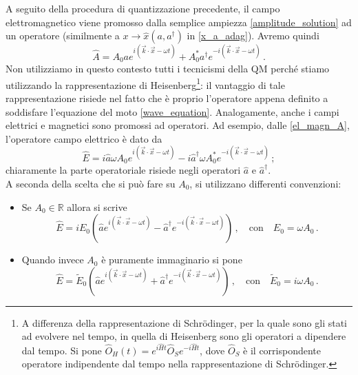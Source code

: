 \noindent A seguito della procedura di quantizzazione precedente, il campo elettromagnetico viene promosso dalla semplice ampiezza \eqref{amplitude_solution} ad un operatore (similmente a $x \to \hat{x}(a,a^\dag)$ in \eqref{x_a_adag}). Avremo quindi
\begin{equation*}
    \hat{A} = A_0 a e^{i \left( \vec{k} \cdot \vec{x} - \omega t \right)} + A_0^\ast a^\dag e^{-i \left( \vec{k} \cdot \vec{x} - \omega t \right)} \, .
\end{equation*}
Non utilizziamo in questo contesto tutti i tecnicismi della QM perché stiamo utilizzando la rappresentazione di Heisenberg\footnote{A differenza della rappresentazione di Schr\"odinger, per la quale sono gli stati ad evolvere nel tempo, in quella di Heisenberg sono gli operatori a dipendere dal tempo. Si pone $\hat{O}_H(t) = e^{i \hat{H} t} \hat{O}_S e^{-i \hat{H} t}$, dove $\hat{O}_S$ è il corrispondente operatore indipendente dal tempo nella rappresentazione di Schr\"odinger.}: il vantaggio di tale rappresentazione risiede nel fatto che è proprio l'operatore appena definito a soddisfare l'equazione del moto \eqref{wave_equation}. Analogamente, anche i campi elettrici e magnetici sono promossi ad operatori. Ad esempio, dalle \eqref{el_magn_A}, l'operatore campo elettrico è dato da
\begin{equation*}
    \hat{E} = i \hat{a} \omega A_0 e^{i \left( \vec{k} \cdot \vec{x} - \omega t \right)} - i \hat{a}^\dag \omega A_0^\ast e^{-i \left( \vec{k} \cdot \vec{x} - \omega t \right)} \, ;
\end{equation*}
chiaramente la parte operatoriale risiede negli operatori $\hat{a}$ e $\hat{a}^\dag$.\\
A seconda della scelta che si può fare su $A_0$, si utilizzano differenti convenzioni:
\begin{itemize}
    \item Se $A_0 \in \mathbb{R}$ allora si scrive
    \begin{equation*}
        \hat{E} = i E_0 \left( \hat{a} e^{i \left( \vec{k} \cdot \vec{x} - \omega t \right)} - \hat{a}^\dag e^{-i \left( \vec{k} \cdot \vec{x} - \omega t \right)} \right) \, , \quad \text{con} \quad E_0 = \omega A_0 \, .
    \end{equation*}
    \item Quando invece $A_0$ è puramente immaginario si pone
    \begin{equation*}
        \hat{E} =  \tilde{E}_0 \left( \hat{a} e^{i \left( \vec{k} \cdot \vec{x} - \omega t \right)} + \hat{a}^\dag e^{-i \left( \vec{k} \cdot \vec{x} - \omega t \right)} \right) \, , \quad \text{con} \quad \tilde{E}_0 = i \omega A_0 \, .
    \end{equation*}
\end{itemize}

